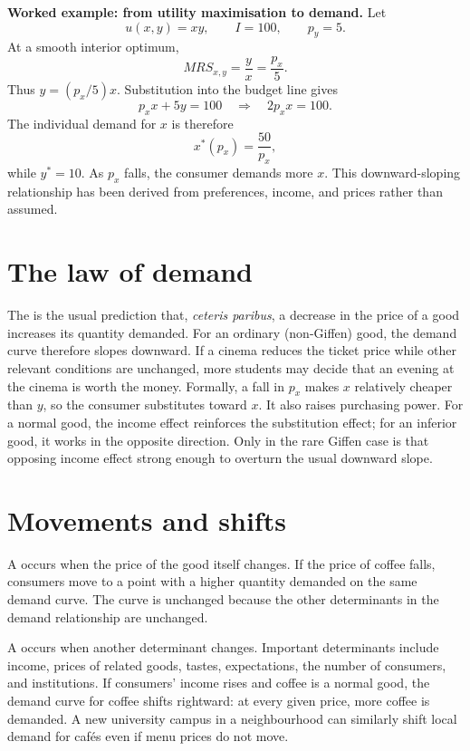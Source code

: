 \begin{keyidea}
\textbf{Worked example: from utility maximisation to demand.}
Let
\[
u(x,y)=xy,
\qquad
I=100,
\qquad
p_y=5.
\]
At a smooth interior optimum,
\[
MRS_{x,y}=\frac{y}{x}=\frac{p_x}{5}.
\]
Thus $y=(p_x/5)x$. Substitution into the budget line gives
\[
p_xx+5y=100
\quad\Longrightarrow\quad
2p_xx=100.
\]
The individual demand for $x$ is therefore
\[
x^*(p_x)=\frac{50}{p_x},
\]
while $y^*=10$. As $p_x$ falls, the consumer demands more $x$. This
downward-sloping relationship has been derived from preferences, income, and
prices rather than assumed.
\end{keyidea}

\section{The law of demand}

The  is the usual prediction that, \emph{ceteris
paribus}, a decrease in the price of a good increases its quantity demanded.
For an ordinary (non-Giffen) good, the demand curve therefore slopes
downward. If a cinema reduces the ticket price while other relevant conditions
are unchanged, more students may decide that an evening at the cinema is
worth the money. Formally, a fall in $p_x$ makes $x$ relatively cheaper than
$y$, so the consumer substitutes toward $x$. It also raises purchasing power.
For a normal good, the income effect reinforces the substitution effect; for
an inferior good, it works in the opposite direction. Only in the rare Giffen
case is that opposing income effect strong enough to overturn the usual
downward slope.

\section{Movements and shifts}

A  occurs when the price of the good
itself changes. If the price of coffee falls, consumers move to a point with a
higher quantity demanded on the same demand curve. The curve is unchanged
because the other determinants in the demand relationship are unchanged.

A  occurs when another determinant changes. Important
determinants include income, prices of related goods, tastes, expectations,
the number of consumers, and institutions. If consumers' income rises and
coffee is a normal good, the demand curve for coffee shifts rightward: at
every given price, more coffee is demanded. A new university campus in a
neighbourhood can similarly shift local demand for cafés even if menu prices
do not move.

